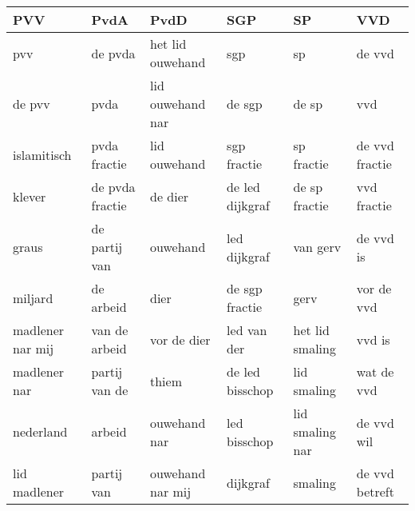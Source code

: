 \begin{tabular}{llllll}
\toprule
              PVV &             PvdA &              PvdD &              SGP &               SP &             VVD \\
\midrule
              pvv &          de pvda &  het lid ouwehand &              sgp &               sp &          de vvd \\
           de pvv &             pvda &  lid ouwehand nar &           de sgp &            de sp &             vvd \\
      islamitisch &     pvda fractie &      lid ouwehand &      sgp fractie &       sp fractie &  de vvd fractie \\
           klever &  de pvda fractie &           de dier &  de led dijkgraf &    de sp fractie &     vvd fractie \\
            graus &    de partij van &          ouwehand &     led dijkgraf &         van gerv &       de vvd is \\
          miljard &        de arbeid &              dier &   de sgp fractie &             gerv &      vor de vvd \\
 madlener nar mij &    van de arbeid &       vor de dier &      led van der &  het lid smaling &          vvd is \\
     madlener nar &    partij van de &             thiem &  de led bisschop &      lid smaling &      wat de vvd \\
        nederland &           arbeid &      ouwehand nar &     led bisschop &  lid smaling nar &      de vvd wil \\
     lid madlener &       partij van &  ouwehand nar mij &         dijkgraf &          smaling &  de vvd betreft \\
\bottomrule
\end{tabular}
